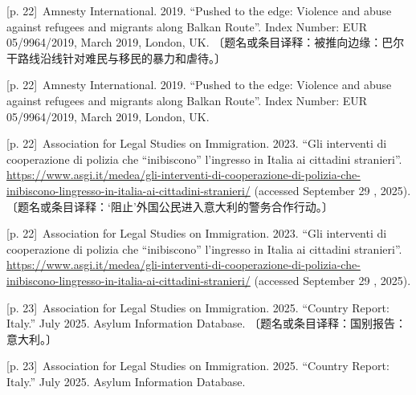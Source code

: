 \documentclass[10pt,a4paper]{article}
\begin{document}
\noindent\begin{minipage}{\textwidth}\begin{minipage}[t]{\dimexpr.5\textwidth-4mm\relax}{\scriptsize\color{gray} [p. 22]}\ Amnesty International. 2019. “Pushed to the edge: Violence and abuse against refugees and migrants along Balkan Route”. Index Number: EUR 05/9964/2019, March 2019, London, UK. 〔题名或条目译释：被推向边缘：巴尔干路线沿线针对难民与移民的暴力和虐待。〕\par\end{minipage}\hfill\begin{minipage}[t]{\dimexpr.5\textwidth-4mm\relax}{\scriptsize\color{gray} [p. 22]}\ Amnesty International. 2019. “Pushed to the edge: Violence and abuse against refugees and migrants along Balkan Route”. Index Number: EUR 05/9964/2019, March 2019, London, UK.\par\end{minipage}\end{minipage}\par
\noindent\begin{minipage}{\textwidth}\begin{minipage}[t]{\dimexpr.5\textwidth-4mm\relax}{\scriptsize\color{gray} [p. 22]}\ Association for Legal Studies on Immigration. 2023. “Gli interventi di cooperazione di polizia che “inibiscono” l’ingresso in Italia ai cittadini stranieri”. \url{https://www.asgi.it/medea/gli-interventi-di-cooperazione-di-polizia-che-inibiscono-lingresso-in-italia-ai-cittadini-stranieri/} (accessed September 29 , 2025). 〔题名或条目译释：‘阻止’外国公民进入意大利的警务合作行动。〕\par\end{minipage}\hfill\begin{minipage}[t]{\dimexpr.5\textwidth-4mm\relax}{\scriptsize\color{gray} [p. 22]}\ Association for Legal Studies on Immigration. 2023. “Gli interventi di cooperazione di polizia che “inibiscono” l’ingresso in Italia ai cittadini stranieri”. \url{https://www.asgi.it/medea/gli-interventi-di-cooperazione-di-polizia-che-inibiscono-lingresso-in-italia-ai-cittadini-stranieri/} (accessed September 29 , 2025).\par\end{minipage}\end{minipage}\par
\noindent\begin{minipage}{\textwidth}\begin{minipage}[t]{\dimexpr.5\textwidth-4mm\relax}{\scriptsize\color{gray} [p. 23]}\ Association for Legal Studies on Immigration. 2025. “Country Report: Italy.” July 2025. Asylum Information Database. 〔题名或条目译释：国别报告：意大利。〕\par\end{minipage}\hfill\begin{minipage}[t]{\dimexpr.5\textwidth-4mm\relax}{\scriptsize\color{gray} [p. 23]}\ Association for Legal Studies on Immigration. 2025. “Country Report: Italy.” July 2025. Asylum Information Database.\par\end{minipage}\end{minipage}\par
\end{document}
